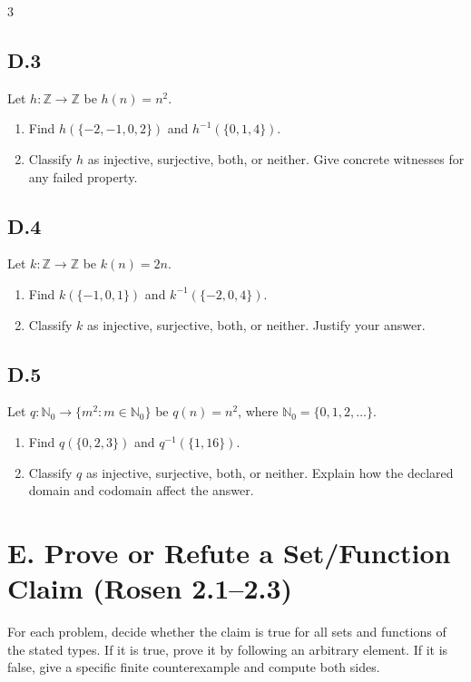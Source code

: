 \documentclass{article}
\begin{document}
\begin{multicols}{3}
\subsection*{D.3}
Let $h:\mathbb Z\to\mathbb Z$ be $h(n)=n^2$.
\begin{enumerate}[label=(\alph*)]
  \item Find $h(\{-2,-1,0,2\})$ and $h^{-1}(\{0,1,4\})$.
  \item Classify $h$ as injective, surjective, both, or neither. Give concrete
  witnesses for any failed property.
\end{enumerate}
\vspace{0.35in}

\subsection*{D.4}
Let $k:\mathbb Z\to\mathbb Z$ be $k(n)=2n$.
\begin{enumerate}[label=(\alph*)]
  \item Find $k(\{-1,0,1\})$ and $k^{-1}(\{-2,0,4\})$.
  \item Classify $k$ as injective, surjective, both, or neither. Justify your
  answer.
\end{enumerate}
\vspace{0.35in}

\subsection*{D.5}
Let $q:\mathbb N_0\to\{m^2:m\in\mathbb N_0\}$ be $q(n)=n^2$, where
$\mathbb N_0=\{0,1,2,\ldots\}$.
\begin{enumerate}[label=(\alph*)]
  \item Find $q(\{0,2,3\})$ and $q^{-1}(\{1,16\})$.
  \item Classify $q$ as injective, surjective, both, or neither. Explain how
  the declared domain and codomain affect the answer.
\end{enumerate}
\vspace{0.35in}


\section*{E. Prove or Refute a Set/Function Claim (Rosen 2.1--2.3)}

For each problem, decide whether the claim is true for all sets and functions
of the stated types. If it is true, prove it by following an arbitrary element.
If it is false, give a specific finite counterexample and compute both sides.



\end{multicols}
\end{document}
